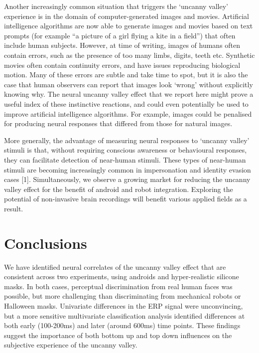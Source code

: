 \documentclass[
]{article}
\begin{document}
Another increasingly common situation that triggers the `uncanny valley' experience is in the domain of computer-generated images and movies. Artificial intelligence algorithms are now able to generate images and movies based on text prompts (for example ``a picture of a girl flying a kite in a field'') that often include human subjects. However, at time of writing, images of humans often contain errors, such as the presence of too many limbs, digits, teeth etc. Synthetic movies often contain continuity errors, and have issues reproducing biological motion. Many of these errors are subtle and take time to spot, but it is also the case that human observers can report that images look `wrong' without explicitly knowing why. The neural uncanny valley effect that we report here might prove a useful index of these instinctive reactions, and could even potentially be used to improve artificial intelligence algorithms. For example, images could be penalised for producing neural responses that differed from those for natural images.

More generally, the advantage of measuring neural responses to `uncanny valley' stimuli is that, without requiring conscious awareness or behavioural responses, they can facilitate detection of near-human stimuli. These types of near-human stimuli are becoming increasingly common in impersonation and identity evasion cases {[}1{]}. Simultaneously, we observe a growing market for reducing the uncanny valley effect for the benefit of android and robot integration. Exploring the potential of non-invasive brain recordings will benefit various applied fields as a result.

\section{Conclusions}\label{conclusions}

We have identified neural correlates of the uncanny valley effect that are consistent across two experiments, using androids and hyper-realistic silicone masks. In both cases, perceptual discrimination from real human faces was possible, but more challenging than discriminating from mechanical robots or Halloween masks. Univariate differences in the ERP signal were unconvincing, but a more sensitive multivariate classification analysis identified differences at both early (100-200ms) and later (around 600ms) time points. These findings suggest the importance of both bottom up and top down influences on the subjective experience of the uncanny valley.
\end{document}
